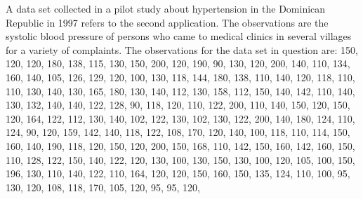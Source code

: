 \documentclass[twoside,leqno,11pt]{article}
\begin{document}
A data set collected in a pilot study about hypertension in the Dominican Republic in 1997 refers to the second application. The observations are the systolic blood pressure of persons who came to medical clinics in several villages for a variety of complaints. The observations for the data set in question are:
         150,
         120,
         120,
         180,
         138,
         115,
         130,
         150,
         200,
         120,
         190,
         90,
         130,
         120,
         200,
         140,
         110,
         134,
         160,
         140,
         105,
         126,
         129,
         120,
         100,
         130,
         118,
         144,
         180,
         138,
         110,
         140,
         120,
         118,
         110,
         110,
         130,
         140,
         130,
         165,
         180,
         130,
         140,
         112,
         130,
         158,
         112,
         150,
         140,
         142,
         110,
         140,
         130,
         132,
         140,
         140,
         122,
         128,
         90,
         118,
         120,
         110,
         122,
         200,
         110,
         140,
         150,
         120,
         150,
         120,
         164,
         122,
         112,
         130,
         140,
         102,
         122,
         130,
         102,
         130,
         122,
         200,
         140,
         180,
         124,
         110,
         124,
         90,
         120,
         159,
         142,
         140,
         118,
         122,
         108,
         170,
         120,
         140,
         100,
         118,
         110,
         114,
         150,
         160,
         140,
         190,
         118,
         120,
         150,
         120,
         200,
         150,
         168,
         110,
         142,
         150,
         160,
         142,
         160,
         150,
         110,
         128,
         122,
         150,
         140,
         122,
         120,
         130,
         100,
         130,
         150,
         130,
         100,
         120,
         105,
         100,
         150,
         196,
         130,
         110,
         140,
         122,
         110,
         164,
         120,
         120,
         150,
         160,
         150,
         135,
         124,
         110,
         100,
         95,
         130,
         120,
         108,
         118,
         170,
         105,
         120,
         95,
         95,
         120,
\end{document}

